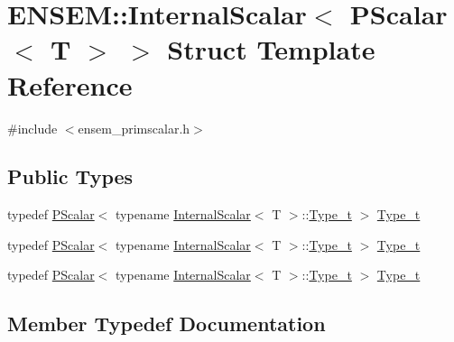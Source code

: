 \hypertarget{structENSEM_1_1InternalScalar_3_01PScalar_3_01T_01_4_01_4}{}\section{E\+N\+S\+EM\+:\+:Internal\+Scalar$<$ P\+Scalar$<$ T $>$ $>$ Struct Template Reference}
\label{structENSEM_1_1InternalScalar_3_01PScalar_3_01T_01_4_01_4}


{\ttfamily \#include $<$ensem\+\_\+primscalar.\+h$>$}

\subsection*{Public Types}
\begin{DoxyCompactItemize}
\item 
typedef \mbox{\hyperlink{classENSEM_1_1PScalar}{P\+Scalar}}$<$ typename \mbox{\hyperlink{structENSEM_1_1InternalScalar}{Internal\+Scalar}}$<$ T $>$\+::\mbox{\hyperlink{structENSEM_1_1InternalScalar_3_01PScalar_3_01T_01_4_01_4_a897c699063633ac7fc5b18fee8981b82}{Type\+\_\+t}} $>$ \mbox{\hyperlink{structENSEM_1_1InternalScalar_3_01PScalar_3_01T_01_4_01_4_a897c699063633ac7fc5b18fee8981b82}{Type\+\_\+t}}
\item 
typedef \mbox{\hyperlink{classENSEM_1_1PScalar}{P\+Scalar}}$<$ typename \mbox{\hyperlink{structENSEM_1_1InternalScalar}{Internal\+Scalar}}$<$ T $>$\+::\mbox{\hyperlink{structENSEM_1_1InternalScalar_3_01PScalar_3_01T_01_4_01_4_a897c699063633ac7fc5b18fee8981b82}{Type\+\_\+t}} $>$ \mbox{\hyperlink{structENSEM_1_1InternalScalar_3_01PScalar_3_01T_01_4_01_4_a897c699063633ac7fc5b18fee8981b82}{Type\+\_\+t}}
\item 
typedef \mbox{\hyperlink{classENSEM_1_1PScalar}{P\+Scalar}}$<$ typename \mbox{\hyperlink{structENSEM_1_1InternalScalar}{Internal\+Scalar}}$<$ T $>$\+::\mbox{\hyperlink{structENSEM_1_1InternalScalar_3_01PScalar_3_01T_01_4_01_4_a897c699063633ac7fc5b18fee8981b82}{Type\+\_\+t}} $>$ \mbox{\hyperlink{structENSEM_1_1InternalScalar_3_01PScalar_3_01T_01_4_01_4_a897c699063633ac7fc5b18fee8981b82}{Type\+\_\+t}}
\end{DoxyCompactItemize}


\subsection{Member Typedef Documentation}
\mbox{\label{structENSEM_1_1InternalScalar_3_01PScalar_3_01T_01_4_01_4_a897c699063633ac7fc5b18fee8981b82}} 
